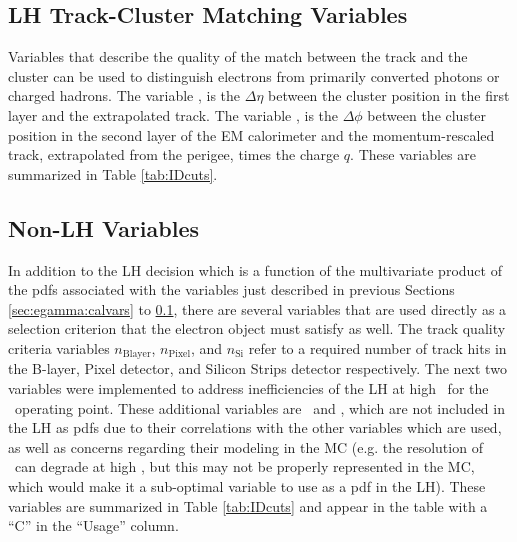 \subsection{LH Track-Cluster Matching Variables}
\label{sec:egamma:trackcalvars}
Variables that describe the quality of the match between the track and the cluster can be used to distinguish electrons from primarily converted photons or charged hadrons.
The variable \deltaeta, is the $\Delta\eta$ between the cluster position in the first layer and the extrapolated track.
The variable \deltaphires, is the $\Delta\phi$ between the cluster position in the second layer of the EM calorimeter and the momentum-rescaled track, extrapolated from the perigee, times the charge $q$.
These variables are summarized in Table \ref{tab:IDcuts}.

\subsection{Non-LH Variables}
\label{sec:egamma:nonLHvars}
In addition to the LH decision which is a function of the multivariate product of the pdfs associated with the variables just described in previous Sections \ref{sec:egamma:calvars} to  \ref{sec:egamma:trackcalvars}, there are several variables that are used directly as a selection criterion that the electron object must satisfy as well.
The track quality criteria variables $n_{\mathrm{Blayer}}$, $n_{\mathrm{Pixel}}$, and $n_{\mathrm{Si}}$ refer to a required number of track hits in the B-layer, Pixel detector, and Silicon Strips detector respectively. 
The next two variables were implemented to address inefficiencies of the LH at high \pt ~for the \Tight\ operating point.
These additional variables are \eoverp\ and \wstot, which are not included in the LH as pdfs due to their correlations with the other variables which are used, as well as concerns regarding their modeling in the MC (e.g. the resolution of \eoverp\ can degrade at high \pt, but this may not be properly represented in the MC, which would make it a sub-optimal variable to use as a pdf in the LH). 
These variables are summarized in Table \ref{tab:IDcuts} and appear in the table with a ``C'' in the ``Usage'' column.

